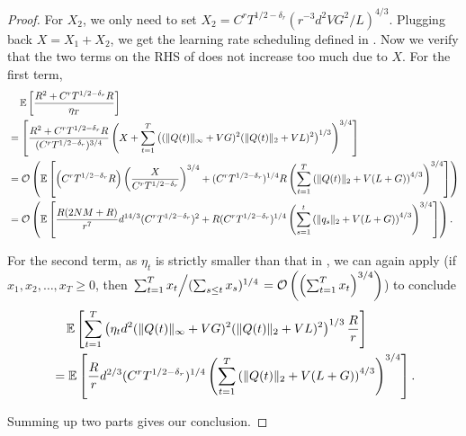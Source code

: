 \documentclass[11pt,fullpage,letterpaper]{article} %
\renewcommand{\bm}[1]{#1}%
\renewcommand{\O}{\operatorname{\mathcal O}}
\newcommand{\E}{\operatornamewithlimits{\mathbb{E}}}
\begin{document}
\begin{proof}
For $X_2$, we only need to set $X_2 = C^r T^{1/2-\delta_r} (r^{-3} d^2 VG^2 / L)^{4/3}$.
Plugging back $X=X_1+X_2$, we get the learning rate scheduling defined in .
Now we verify that the two terms on the RHS of  does not increase too much due to $X$. For the first term,
\begin{align*}
&\quad \E\left [\frac{R^2 + C^r T^{1/2 - \delta_r} R}{\eta_T}\right ]\\
&=\left [\frac{R^2 + C^r T^{1/2 - \delta_r} R}{(C^r T^{1/2 - \delta_r})^{3/4}}\left (X + \sum_{t=1}^T \left ((\lVert \bm Q(t)\rVert_\infty + VG)^2 (\lVert \bm Q(t)\rVert_2 + VL)^2\right )^{1/3}\right )^{3/4}\right ]\\
&=\O\left (\E\left [\left (C^r T^{1/2 - \delta_r} R\right ) \left (\frac{X}{C^r T^{1/2 - \delta_r}}\right )^{3/4}+(C^r T^{1/2 - \delta_r})^{1/4} R \left (\sum_{t=1}^T \left (\lVert \bm Q(t)\rVert_2 + V(L+G)\right )^{4/3} \right )^{3/4}\right ]\right )\\
&=\O \left (\E\left [\frac{R(2NM+R)}{r^7} d^{14/3} (C^r T^{1/2-\delta_r})^2 + R (C^r T^{1/2 - \delta_r})^{1/4} \left (\sum_{s=1}^t \left (\lVert \bm q_s\rVert_2 + V(L+G)\right )^{4/3} \right )^{3/4}\right ]\right ).
\end{align*}

For the second term, as $\eta_t$ is strictly smaller than that in , we can again apply  (if $x_1,x_2,\ldots,x_T\ge 0$, then $\left .\sum_{t=1}^T x_t \middle / (\sum_{s\le t} x_s)^{1/4} \right . =\O\left (\left (\sum_{t=1}^T x_t\right )^{3/4}\right )$) to conclude
\begin{align*}
&\quad \E\left [\sum_{t=1}^T \left (\eta_t d^2 (\lVert \bm Q(t)\rVert_\infty + VG)^2 (\lVert \bm Q(t)\rVert_2 + VL)^2\right )^{1/3} \frac{R}{r}\right ]\\
&=\E\left [\frac{R}{r} d^{2/3} (C^r T^{1/2 - \delta_r})^{1/4} \left (\sum_{t=1}^T \left (\lVert \bm Q(t)\rVert_2 + V(L+G)\right )^{4/3}\right )^{3/4}\right ].
\end{align*}

Summing up two parts gives our conclusion.
\end{proof}
\end{document}
